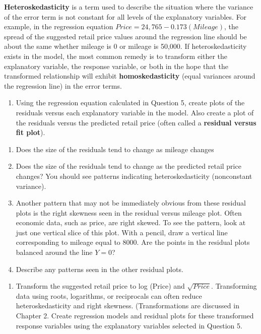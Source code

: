 \documentclass[
]{report}
\providecommand{\tightlist}{%
  \setlength{\itemsep}{0pt}\setlength{\parskip}{0pt}}
\begin{document}
\textbf{Heteroskedasticity} is a term used to describe the situation where the variance of the error term is not constant for all levels of the explanatory variables. For example, in the regression equation \(Price = 24,765 - 0.173 (Mileage)\), the spread of the suggested retail price values around the regression line should be about the same whether mileage is 0 or mileage is 50,000. If heteroskedasticity exists in the model, the most common remedy is to transform either the explanatory variable, the response variable, or both in the hope that the transformed relationship will exhibit \textbf{homoskedasticity} (equal variances around the regression line) in the error terms.

\begin{enumerate}
\def\labelenumi{\arabic{enumi}.}
\setcounter{enumi}{6}
\tightlist
\item
  Using the regression equation calculated in Question 5, create plots of the residuals versus each explanatory variable in the model. Also create a plot of the residuals versus the predicted retail price (often called a \textbf{residual versus fit plot}).
\end{enumerate}

\begin{enumerate}
\def\labelenumi{\alph{enumi}.}
\item
  Does the size of the residuals tend to change as mileage changes
\item
  Does the size of the residuals tend to change as the predicted retail price changes? You should see patterns indicating heteroskedasticity (nonconstant variance).
\item
  Another pattern that may not be immediately obvious from these residual plots is the right skewness seen in the residual versus mileage plot. Often economic data, such as price, are right skewed. To see the pattern, look at just one vertical slice of this plot. With a pencil, draw a vertical line corresponding to mileage equal to 8000. Are the points in the residual plots balanced around the line \(Y = 0\)?
\item
  Describe any patterns seen in the other residual plots.
\end{enumerate}

\begin{enumerate}
\def\labelenumi{\arabic{enumi}.}
\setcounter{enumi}{7}
\tightlist
\item
  Transform the suggested retail price to log (Price) and \(\sqrt{Price}\). Transforming data using roots, logarithms, or reciprocals can often reduce heteroskedasticity and right skewness. (Transformations are discussed in Chapter 2. Create regression models and residual plots for these transformed response variables using the explanatory variables selected in Question 5.
\end{enumerate}
\end{document}
